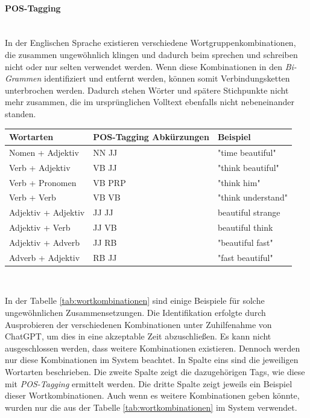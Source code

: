 \paragraph{POS-Tagging}\mbox{}\\
\label{postagging}
In der Englischen Sprache existieren verschiedene Wortgruppenkombinationen, die zusammen ungewöhnlich klingen und dadurch beim sprechen und schreiben nicht oder nur selten verwendet werden. Wenn diese Kombinationen in den \emph{Bi-Grammen} identifiziert und entfernt werden, können somit Verbindungsketten unterbrochen werden. Dadurch stehen Wörter und spätere Stichpunkte nicht mehr zusammen, die im ursprünglichen Volltext ebenfalls nicht nebeneinander standen.
\begin{center}
	\begin{tabularx}{1\textwidth} { 
			| >{\raggedright\arraybackslash}X 
			| >{\raggedright\arraybackslash}X
			| >{\raggedright\arraybackslash}X | }
		\hline
		Wortarten & POS-Tagging Abkürzungen & Beispiel \\
		\hline
		\hline
		Nomen + Adjektiv & NN JJ & "time beautiful"\\
		\hline
		Verb + Adjektiv & VB JJ & "think beautiful"\\
		\hline
		Verb + Pronomen & VB PRP & "think him"\\
		\hline
		Verb + Verb & VB VB & "think understand"\\
		\hline
		Adjektiv + Adjektiv & JJ JJ & beautiful strange\\
		\hline
		Adjektiv + Verb & JJ VB & beautiful think\\
		\hline
		Adjektiv + Adverb & JJ RB & "beautiful fast"\\
		\hline
		Adverb + Adjektiv & RB JJ & "fast beautiful"\\
		\hline
	\end{tabularx}\\
	\label{tab:wortkombinationen}
\end{center}
In der Tabelle \ref{tab:wortkombinationen} sind einige Beispiele für solche ungewöhnlichen Zusammensetzungen. Die Identifikation erfolgte durch Ausprobieren der verschiedenen Kombinationen unter Zuhilfenahme von ChatGPT, um dies in eine akzeptable Zeit abzuschließen. Es kann nicht ausgeschlossen werden, dass weitere Kombinationen existieren. Dennoch werden nur diese Kombinationen im System beachtet. In Spalte eins sind die jeweiligen Wortarten beschrieben. Die zweite Spalte zeigt die dazugehörigen Tags, wie diese mit \emph{POS-Tagging} ermittelt werden. Die dritte Spalte zeigt jeweils ein Beispiel dieser Wortkombinationen. Auch wenn es weitere Kombinationen geben könnte, wurden nur die aus der Tabelle \ref{tab:wortkombinationen} im System verwendet.\\

